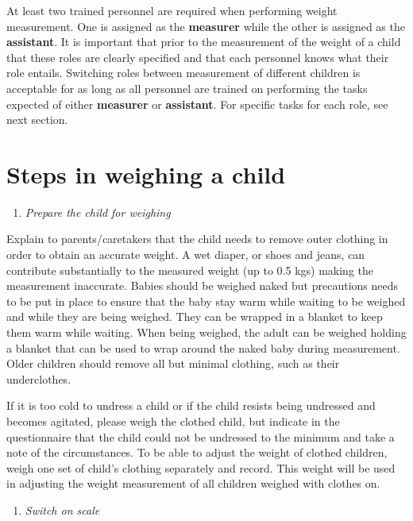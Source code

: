 \documentclass[12pt,]{book}
\providecommand{\tightlist}{%
  \setlength{\itemsep}{0pt}\setlength{\parskip}{0pt}}
\theoremstyle{definition}
\theoremstyle{definition}
\theoremstyle{definition}
\theoremstyle{remark}
\begin{document}
At least two trained personnel are required when performing weight
measurement. One is assigned as the \textbf{measurer} while the other is
assigned as the \textbf{assistant}. It is important that prior to the
measurement of the weight of a child that these roles are clearly
specified and that each personnel knows what their role entails.
Switching roles between measurement of different children is acceptable
for as long as all personnel are trained on performing the tasks
expected of either \textbf{measurer} or \textbf{assistant}. For specific
tasks for each role, see next section.

\hypertarget{steps-in-weighing-a-child}{%
\section{Steps in weighing a child}\label{steps-in-weighing-a-child}}

\begin{enumerate}
\def\labelenumi{\arabic{enumi}.}
\tightlist
\item
  \emph{Prepare the child for weighing}
\end{enumerate}

Explain to parents/caretakers that the child needs to remove outer
clothing in order to obtain an accurate weight. A wet diaper, or shoes
and jeans, can contribute substantially to the measured weight (up to
0.5 kgs) making the measurement inaccurate. Babies should be weighed
naked but precautions needs to be put in place to ensure that the baby
stay warm while waiting to be weighed and while they are being weighed.
They can be wrapped in a blanket to keep them warm while waiting. When
being weighed, the adult can be weighed holding a blanket that can be
used to wrap around the naked baby during measurement. Older children
should remove all but minimal clothing, such as their underclothes.

If it is too cold to undress a child or if the child resists being
undressed and becomes agitated, please weigh the clothed child, but
indicate in the questionnaire that the child could not be undressed to
the minimum and take a note of the circumstances. To be able to adjust
the weight of clothed children, weigh one set of child's clothing
separately and record. This weight will be used in adjusting the weight
measurement of all children weighed with clothes on.

\begin{enumerate}
\def\labelenumi{\arabic{enumi}.}
\setcounter{enumi}{1}
\tightlist
\item
  \emph{Switch on scale}
\end{enumerate}
\end{document}
